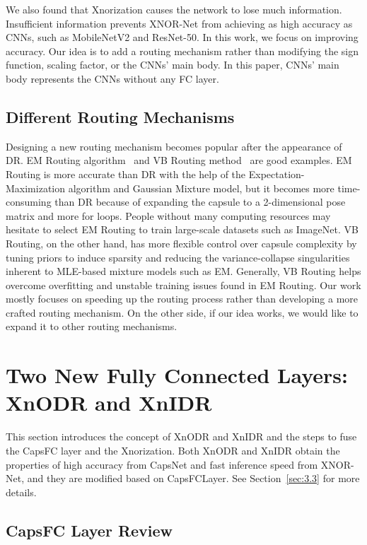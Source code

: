 \documentclass[sn-mathphys,iicol,Numbered]{sn-jnl}
\begin{document}
We also found that Xnorization causes the network to lose much information. Insufficient information prevents XNOR-Net from achieving as high accuracy as CNNs, such as MobileNetV2 and ResNet-50. In this work, we focus on improving accuracy. Our idea is to add a routing mechanism rather than modifying the sign function, scaling factor, or the CNNs' main body. In this paper, CNNs' main body represents the CNNs without any FC layer.

\subsection{Different Routing Mechanisms} \label{sec:2.3}

Designing a new routing mechanism becomes popular after the appearance of DR. EM Routing algorithm~\citep{A3_emr} and VB Routing method~\citep{A23_vb} are good examples. EM Routing is more accurate than DR with the help of the Expectation-Maximization algorithm and Gaussian Mixture model, but it becomes more time-consuming than DR because of expanding the capsule to a 2-dimensional pose matrix and more for loops. People without many computing resources may hesitate to select EM Routing to train large-scale datasets such as ImageNet. VB Routing, on the other hand, has more flexible control over capsule complexity by tuning priors to induce sparsity and reducing the variance-collapse singularities inherent to MLE-based mixture models such as EM. Generally, VB Routing helps overcome overfitting and unstable training issues found in EM Routing. Our work mostly focuses on speeding up the routing process rather than developing a more crafted routing mechanism. On the other side, if our idea works, we would like to expand it to other routing mechanisms.

\section{Two New Fully Connected Layers: XnODR and XnIDR} \label{sec:3}

This section introduces the concept of XnODR and XnIDR and the steps to fuse the CapsFC layer and the Xnorization. Both XnODR and XnIDR obtain the properties of high accuracy from CapsNet and fast inference speed from XNOR-Net, and they are modified based on CapsFCLayer. See Section~\ref{sec:3.3} for more details.

\subsection{CapsFC Layer Review} \label{sec:3.1}
\end{document}
